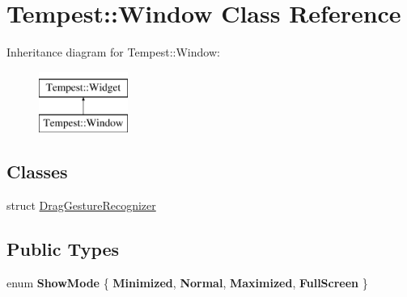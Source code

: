 \hypertarget{class_tempest_1_1_window}{\section{Tempest\+:\+:Window Class Reference}
\label{class_tempest_1_1_window}
}
Inheritance diagram for Tempest\+:\+:Window\+:\begin{figure}[H]
\begin{center}
\leavevmode
\includegraphics[height=2.000000cm]{class_tempest_1_1_window}
\end{center}
\end{figure}
\subsection*{Classes}
\begin{DoxyCompactItemize}
\item 
struct \hyperlink{struct_window_1_1_drag_gesture_recognizer}{Drag\+Gesture\+Recognizer}
\end{DoxyCompactItemize}
\subsection*{Public Types}
\begin{DoxyCompactItemize}
\item 
\hypertarget{class_tempest_1_1_window_a3175d8ef35fe6a81144aabafae9930f1}{enum {\bfseries Show\+Mode} \{ {\bfseries Minimized}, 
{\bfseries Normal}, 
{\bfseries Maximized}, 
{\bfseries Full\+Screen}
 \}}\label{class_tempest_1_1_window_a3175d8ef35fe6a81144aabafae9930f1}

\end{DoxyCompactItemize}
